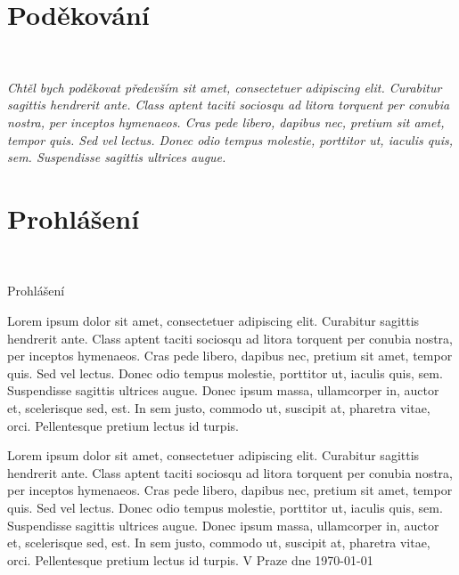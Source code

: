 \documentclass[a4paper,czech,unicode,twoside]{book}[2019/12/20]
\makeatletter
\def\frontchapterfont{\Large \bfseries}
\newcommand{\frontchapternotprinted}[1]{%
  \begingroup
  \let\@makechapterhead\@gobble %
  \let\cleardoublepage\clearpage
  \chapter{#1}
  \endgroup
}
\theoremstyle{plain}
\theoremstyle{definition}
\theoremstyle{remark}
\numberwithin{theorem}{chapter}
\newenvironment{prohlaseni}{
  {{\frontchapterfont\begin{flushright}{\color{heading}Prohlášení}\end{flushright}}}%
  \bigskip
  \noindent\ignorespaces}
\makeatother
\begin{document}
\tableofcontents
\listoffigures
\begingroup
\let\clearpage\relax
\listoftables
\lstlistoflistings
\endgroup

\frontchapternotprinted{Poděkování}
~
\vfill
\hskip 0cm \begin{minipage}{0.7\textwidth}
\textit{Chtěl bych poděkovat především sit amet, consectetuer adipiscing elit. Curabitur sagittis hendrerit ante. Class aptent taciti sociosqu ad litora torquent per conubia nostra, per inceptos hymenaeos. Cras pede libero, dapibus nec, pretium sit amet, tempor quis. Sed vel lectus. Donec odio tempus molestie, porttitor ut, iaculis quis, sem. Suspendisse sagittis ultrices augue.}
\end{minipage}

\vfill

\vfill



\frontchapternotprinted{Prohlášení}
~
\vfill
\begin{prohlaseni}
Lorem ipsum dolor sit amet, consectetuer adipiscing elit. Curabitur sagittis hendrerit ante. Class aptent taciti sociosqu ad litora torquent per conubia nostra, per inceptos hymenaeos. Cras pede libero, dapibus nec, pretium sit amet, tempor quis. Sed vel lectus. Donec odio tempus molestie, porttitor ut, iaculis quis, sem. Suspendisse sagittis ultrices augue. Donec ipsum massa, ullamcorper in, auctor et, scelerisque sed, est. In sem justo, commodo ut, suscipit at, pharetra vitae, orci. Pellentesque pretium lectus id turpis.

Lorem ipsum dolor sit amet, consectetuer adipiscing elit. Curabitur sagittis hendrerit ante. Class aptent taciti sociosqu ad litora torquent per conubia nostra, per inceptos hymenaeos. Cras pede libero, dapibus nec, pretium sit amet, tempor quis. Sed vel lectus. Donec odio tempus molestie, porttitor ut, iaculis quis, sem. Suspendisse sagittis ultrices augue. Donec ipsum massa, ullamcorper in, auctor et, scelerisque sed, est. In sem justo, commodo ut, suscipit at, pharetra vitae, orci. Pellentesque pretium lectus id turpis.
\vskip 1cm
\noindent
V Praze dne \today \hspace{.3\textwidth} \dotfill
\end{prohlaseni}
\end{document}
